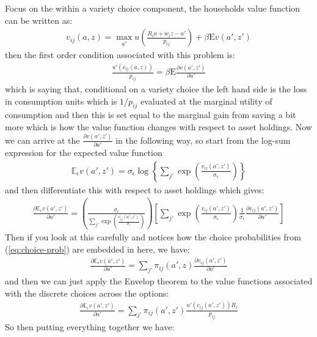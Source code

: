 \documentclass[12pt,pdftex]{article}
\begin{document}
\begin{onehalfspacing}
Focus on the within a variety choice component, the households value function can be written as:
\begin{align}
v_{ij}(a, z) = \max_{a'} u \left( \frac{R_i a + w_i z - a'}{p_{ij}} \right) + \beta  \mathrm{E} v(a', z')
\end{align}
then the first order condition associated with this problem is:
\begin{align}
\frac{u'(c_{ij}(a, z))}{p_{ij}} = \beta \mathrm{E} \frac{\partial v(a', z')}{\partial a'}
\end{align}
which is saying that, conditional on a variety choice the left hand side is the loss in consumption units which is $1 / p_{ij}$ evaluated at the marginal utility of consumption and then this is set equal to the marginal gain from saving a bit more which is how the value function changes with respect to asset holdings. Now we can arrive at the $\frac{\partial v(a', z')}{\partial a'}$ in the following way, so start from the log-sum expression for the expected value function
\begin{align}
\mathbb{E}_{\epsilon} v(a', z') =  \sigma_{\epsilon} \log \left\{ \sum_{j'} \exp \left( \frac{  v_{ij}(a', z')}{\sigma_{\epsilon}} \right) \right\}
\end{align}
and then differentiate this with respect to asset holdings which gives:
\begin{align}
\frac{\partial \mathbb{E}_{\epsilon} v(a', z')}{\partial a'} = \left( \frac{\sigma_{\epsilon}}{\sum_{j'} \exp \left( \frac{  v_{ij}(a', z')}{\sigma_{\epsilon}}\right)} \right)
\left[ \sum_{j'} \exp \left( \frac{  v_{ij}(a', z')}{\sigma_{\epsilon}}\right) \frac{1}{\sigma_{\epsilon}} \frac{\partial v_{ij}(a', z')}{\partial a'}  \right]
\end{align}
Then if you look at this carefully and notices how the choice probabilities from (\ref{eq:choice-prob}) are embedded in here, we have:
\begin{align}
\frac{\partial \mathbb{E}_{\epsilon} v(a', z')}{\partial a'} = \sum_{j'} \pi_{ij}(a', z) \frac{\partial v_{ij}(a', z')}{\partial a'}
\end{align}
and then we can just apply the Envelop theorem to the value functions associated with the discrete choices across the options:
\begin{align}
\frac{\partial \mathbb{E}_{\epsilon} v(a', z')}{\partial a'} = \sum_{j'} \pi_{ij}(a', z') \frac{u'(c_{ij}(a', z'))R_{i}}{p_{ij}}
\end{align}
So then putting everything together we have:
\begin{align}

\end{align}
\end{onehalfspacing}
\end{document}

